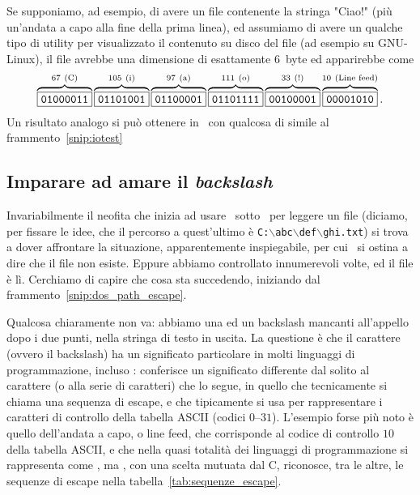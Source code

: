 
Se supponiamo, ad esempio, di avere un file contenente la stringa "Ciao!" (pi\`u
un'andata a capo alla fine della prima linea), ed assumiamo di avere un qualche tipo
di utility per visualizzato il contenuto su disco del file (ad esempio  su
GNU-Linux), il file avrebbe una dimensione di esattamente $6$~byte ed apparirebbe
come
\begin{align*}
  \overbrace{\byte{01000011}}^{67~\text{(C)}}
  \overbrace{\byte{01101001}}^{105~\text{(i)}}
  \overbrace{\byte{01100001}}^{97~\text{(a)}}
  \overbrace{\byte{01101111}}^{111~\text{(o)}}
  \overbrace{\byte{00100001}}^{33~\text{(!)}}
  \overbrace{\byte{00001010}}^{10~\text{(Line feed)}}.
\end{align*}
Un risultato analogo si pu\`o ottenere in \python\ con qualcosa di simile al
frammento~\ref{snip:iotest}



\subsection{Imparare ad amare il \emph{backslash}}

Invariabilmente il neofita che inizia ad usare \python\ sotto \windows\ per leggere un
file (diciamo, per fissare le idee, che il percorso a quest'ultimo \`e
\texttt{C:$\backslash$abc$\backslash$def$\backslash$ghi.txt}) si trova a dover affrontare
la situazione, apparentemente inspiegabile, per cui \python\ si ostina a dire che
il file non esiste. Eppure abbiamo controllato innumerevoli volte, ed il file \`e l\`i.
Cerchiamo di capire che cosa sta succedendo, iniziando dal frammento~\ref{snip:dos_path_escape}.


Qualcosa chiaramente non va: abbiamo una  ed un backslash mancanti all'appello
dopo i due punti, nella stringa di testo in uscita. La questione \`e che il carattere
\cchar{\textbackslash} (ovvero il backslash) ha un significato particolare in molti
linguaggi di programmazione, incluso \python: conferisce un significato differente
dal solito al carattere (o alla serie di caratteri) che lo segue, in quello che
tecnicamente si chiama una sequenza di escape, e che tipicamente si usa per rappresentare
i caratteri di controllo della tabella ASCII (codici $0$--$31$). L'esempio forse
pi\`u noto \`e quello dell'andata a capo, o line feed, che corrisponde al codice di
controllo $10$ della tabella ASCII, e che nella quasi totalit\`a dei linguaggi di
programmazione si rappresenta come , ma \python, con una
scelta mutuata dal C, riconosce, tra le altre, le sequenze di escape nella
tabella~\ref{tab:sequenze_escape}.

